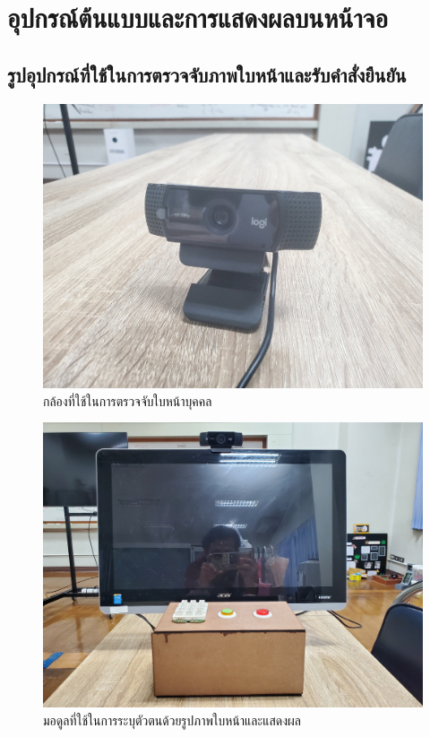 \chapter{อุปกรณ์ต้นแบบและการแสดงผลบนหน้าจอ}



\section{รูปอุปกรณ์ที่ใช้ในการตรวจจับภาพใบหน้าและรับคำสั่งยืนยัน}


\begin{figure}[!ht]
  \begin{center}
    \includegraphics[scale=.2]{pic/camera.jpg}
    \caption[camera]{กล้องที่ใช้ในการตรวจจับใบหน้าบุคคล}
    \label{fig:camera_logi}
  \end{center}
\end{figure}

\begin{figure}[!ht]
  \begin{center}
    \includegraphics[scale=.2]{pic/system.jpg}
    \caption[face detection module]{มอดูลที่ใช้ในการระบุตัวตนด้วยรูปภาพใบหน้าและแสดงผล}
    \label{fig:face_module}
  \end{center}
\end{figure}

